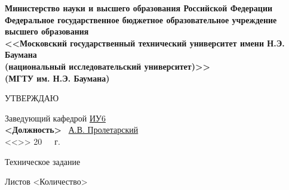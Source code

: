 \documentclass[utf8x, 12pt, oneside, a4paper]{article}
\begin{document}
	\thispagestyle{empty}
	\begin{center}
		\fontsize{12pt}{0.3\baselineskip}\selectfont \textbf{Министерство науки и высшего образования Российской Федерации 
		\\ Федеральное государственное бюджетное образовательное учреждение 
		\\ высшего образования 
		\\ <<Московский государственный технический университет имени Н.Э. Баумана
		\\ (национальный исследовательский университет)>>
		\\ (МГТУ им. Н.Э. Баумана)}
		
		\fontsize{12pt}{0.5\baselineskip}\selectfont
		\noindent \makebox[\linewidth]{\rule{\textwidth}{4pt}} \makebox[\linewidth]{\rule{\textwidth}{1pt}}
	\end{center}	
	
	\begin{flushright}
		\fontsize{12pt}{\baselineskip}\selectfont
		УТВЕРЖДАЮ \hspace*{1.4cm}

		\fontsize{12pt}{\baselineskip}\selectfont
		Заведующий кафедрой \uline{\hspace*{0.5cm}}\uline{ИУ6}\uline{\hspace*{0.5cm}} 
		\\ \hfill \textbf{<Должность>} \uline{\hspace*{2.5cm}} \ \uline{А.В. Пролетарский} 
		\\ <<\uline{\hspace*{1cm}}>> \uline{\hspace*{2.5cm}} 20\ \ \   г.
	\end{flushright}
	
	\vfill
	
	
	\begin{center}
		\fontsize{14pt}{\baselineskip}
	\end{center}

	\center
	Техническое задание

	\center Листов <Количество>

	\vfill
\end{document}
